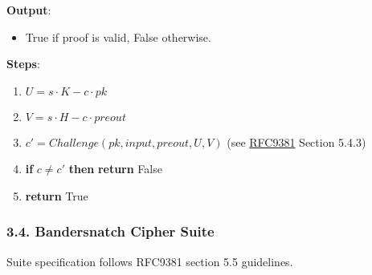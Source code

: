 \documentclass[
]{article}
\providecommand{\tightlist}{%
  \setlength{\itemsep}{0pt}\setlength{\parskip}{0pt}}
\begin{document}
\textbf{Output}:

\begin{itemize}
\tightlist
\item
  True if proof is valid, False otherwise.
\end{itemize}

\textbf{Steps}:

\begin{enumerate}
\def\labelenumi{\arabic{enumi}.}
\tightlist
\item
  \(U = s \cdot K - c \cdot pk\)
\item
  \(V = s \cdot H - c \cdot preout\)
\item
  \(c' = Challenge(pk, input, preout, U, V)\) (see
  \href{https://datatracker.ietf.org/doc/rfc9381/}{RFC9381} Section
  5.4.3)
\item
  \textbf{if} \(c \neq c'\) \textbf{then} \textbf{return} False
\item
  \textbf{return} True
\end{enumerate}

\hypertarget{bandersnatch-cipher-suite}{%
\subsubsection{3.4. Bandersnatch Cipher
Suite}\label{bandersnatch-cipher-suite}}

Suite specification follows RFC9381 section 5.5 guidelines.
\end{document}
